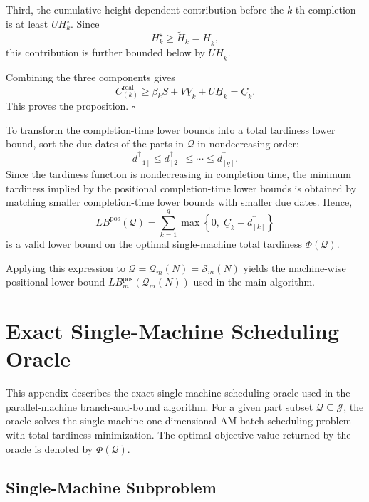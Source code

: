 \documentclass[letterpaper, 10 pt, conference]{ieeeconf}  %
\newcounter{proposition}
\begin{document}
Third, the cumulative height-dependent contribution before the $k$-th
completion is at least $UH_k^{\star}$. Since
\[
H_k^{\star}\ge \widetilde{H}_k=\underline{H}_k,
\]
this contribution is further bounded below by $U\underline{H}_k$.

Combining the three components gives
\[
C_{(k)}^{\mathrm{real}}
\ge
\beta_k S
+
V\underline{V}_k
+
U\underline{H}_k
=
\underline{C}_k.
\]
This proves the proposition.
\hfill $\square$

To transform the completion-time lower bounds into a total tardiness lower
bound, sort the due dates of the parts in $\mathcal{Q}$ in nondecreasing
order:
\[
d_{[1]}^{\uparrow}\le d_{[2]}^{\uparrow}\le \cdots \le d_{[q]}^{\uparrow}.
\]
Since the tardiness function is nondecreasing in completion time, the
minimum tardiness implied by the positional completion-time lower bounds is
obtained by matching smaller completion-time lower bounds with smaller due
dates. Hence,
\[
LB^{\mathrm{pos}}(\mathcal{Q})
=
\sum_{k=1}^{q}
\max
\left\{
0,\;
\underline{C}_k-d_{[k]}^{\uparrow}
\right\}
\]
is a valid lower bound on the optimal single-machine total tardiness
$\Phi(\mathcal{Q})$.

Applying this expression to
$\mathcal{Q}=\mathcal{Q}_m(N)=\mathcal{S}_m(N)$ yields the machine-wise
positional lower bound $LB_m^{\mathrm{pos}}(\mathcal{Q}_m(N))$ used in the
main algorithm.


\appendix
\section{Exact Single-Machine Scheduling Oracle}
\label{app:single_machine_oracle}

This appendix describes the exact single-machine scheduling oracle used in
the parallel-machine branch-and-bound algorithm. For a given part subset
$\mathcal{Q}\subseteq \mathcal{J}$, the oracle solves the single-machine
one-dimensional AM batch scheduling problem with total tardiness
minimization. The optimal objective value returned by the oracle is denoted
by $\Phi(\mathcal{Q})$.

\subsection{Single-Machine Subproblem}
\end{document}
